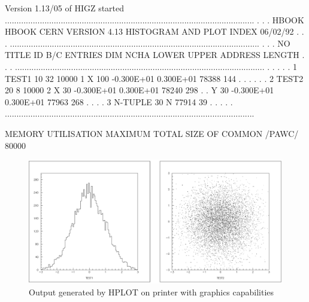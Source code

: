 \begin{Listing}
Version 1.13/05 of HIGZ started
...........................................................................................................
.                                                                                                         .
.   HBOOK   HBOOK  CERN    VERSION   4.13     HISTOGRAM AND PLOT INDEX                     06/02/92       .
.                                                                                                         .
...........................................................................................................
.                                                                                                         .
.  NO            TITLE             ID  B/C  ENTRIES DIM   NCHA     LOWER       UPPER       ADDRESS LENGTH .
.                                                                                                         .
...........................................................................................................
.                                                                                                         .
.                                                                                                         .
.   1  TEST1                       10  32    10000  1  X   100  -0.300E+01   0.300E+01       78388    144 .
.                                                                                                         .
.                                                                                                         .
.   2  TEST2                       20   8    10000  2  X    30  -0.300E+01   0.300E+01       78240    298 .
.                                                      Y    30  -0.300E+01   0.300E+01       77963    268 .
.                                                                                                         .
.   3  N-TUPLE                     30               N                                        77914     39 .
.                                                                                                         .
.                                                                                                         .
...........................................................................................................

 MEMORY UTILISATION
      MAXIMUM TOTAL SIZE OF COMMON /PAWC/            80000
\end{Listing}

\begin{figure}[h]
\begin{makeimage}
\includegraphics[width=\linewidth]{hbookc11.eps}
\end{makeimage}
\caption{Output generated by HPLOT on printer with graphics capabilities}
\end{figure}

